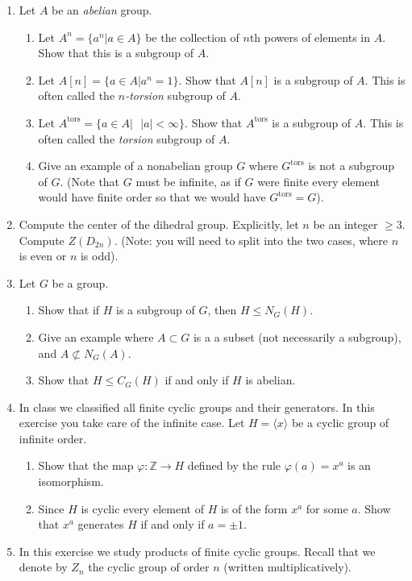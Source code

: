 \documentclass[11pt]{article}
\newcommand{\la}{\langle}
\newcommand{\ra}{\rangle}
\newcommand{\tors}{\mathrm{tors}}
\begin{document}
\begin{enumerate}
  \item Let $A$ be an \textit{abelian} group.
  \begin{enumerate}
    \item Let $A^n = \{a^n|a\in A\}$ be the collection of $n$th powers of elements in $A$.  Show that this is a subgroup of $A$.
    \item Let $A[n] = \{a\in A|a^n=1\}$.  Show that $A[n]$ is a subgroup of $A$.  This is often called the $n$\textit{-torsion} subgroup of $A$.
    \item Let $A^\tors = \{a\in A |\text{ }|a|<\infty\}$.  Show that $A^\tors$ is a subgroup of $A$.  This is often called the \textit{torsion} subgroup of $A$.
    \item Give an example of a nonabelian group $G$ where $G^\tors$ is not a subgroup of $G$.  (Note that $G$ must be infinite, as if $G$ were finite every element would have finite order so that we would have $G^\tors = G$).
  \end{enumerate}
  \item Compute the center of the dihedral group.  Explicitly, let $n$ be an integer $\ge3$.  Compute $Z(D_{2n})$.  (Note: you will need to split into the two cases, where $n$ is even or $n$ is odd).
  \item Let $G$ be a group.
  \begin{enumerate}
    \item Show that if $H$ is a subgroup of $G$, then $H\le N_G(H)$.
    \item Give an example where $A\subset G$ is a a subset (not necessarily a subgroup), and $A\not\subset N_G(A)$.
    \item Show that $H\le C_G(H)$ if and only if $H$ is abelian.
  \end{enumerate}
  \item In class we classified all finite cyclic groups and their generators.  In this exercise you take care of the infinite case.  Let $H = \la x\ra$ be a cyclic group of infinite order.
  \begin{enumerate}
    \item Show that the map $\varphi:\mathbb{Z}\to H$ defined by the rule $\varphi(a) = x^a$ is an isomorphism.
    \item Since $H$ is cyclic every element of $H$ is of the form $x^a$ for some $a$.  Show that $x^a$ generates $H$ if and only if $a=\pm1$.
  \end{enumerate}
  \item In this exercise we study products of finite cyclic groups.  Recall that we denote by $Z_n$ the cyclic group of order $n$ (written multiplicatively).

\end{enumerate}
\end{document}
